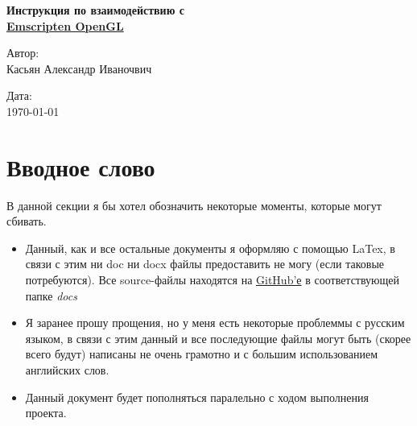 \documentclass[12pt]{article}
\begin{document}
    \begin{titlepage}
    \center %
    \newcommand{\HRline}[1]{\rule{\linewidth}{#1}} %
    \vspace*{\fill}
    \textbf{\LARGE Инструкция по взаимодействию с \\ \href{https://github.com/JuiceFV/Emscripten_OpenGL}{Emscripten OpenGL}}
    \vspace*{\fill}
    \begin{multicols}{2}
        \begin{flushleft}
            \large Автор: \\
            \large Касьян Александр Иваночвич
        \end{flushleft}

        
        \columnbreak
        \begin{flushright}
            \large Дата:\\
            \large {\large \today}
        \end{flushright}
    \end{multicols}
    \end{titlepage}

    \newpage

    \tableofcontents

    \newpage
    \section{Вводное слово}
    В данной секции я бы хотел обозначить некоторые моменты, которые могут
    сбивать.
    \begin{itemize}
        \item Данный, как и все остальные документы я оформляю с помощью 
        LaTex, в связи с этим ни doc ни docx файлы предоставить не могу 
        (если таковые потребуются). Все source-файлы находятся на 
        \href{https://github.com/JuiceFV/Emscripten_OpenGL}{GitHub'е}
        в соответствующей папке \emph{docs}
        \item Я заранее прошу прощения, но у меня есть некоторые проблеммы
        с русским языком, в связи с этим данный и все последующие файлы 
        могут быть (скорее всего будут) написаны не очень грамотно и с 
        большим использованием английских слов. 
        \item Данный документ будет пополняться паралельно с ходом выполнения
        проекта.
    \end{itemize}
    \newpage
\end{document}
